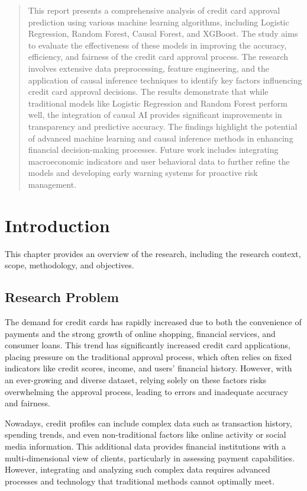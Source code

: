 \documentclass[12pt]{report}
\begin{document}
    \begin{abstract}
        This report presents a comprehensive analysis of credit card approval prediction using various machine learning algorithms, including Logistic Regression, Random Forest, Causal Forest, and XGBoost. The study aims to evaluate the effectiveness of these models in improving the accuracy, efficiency, and fairness of the credit card approval process. The research involves extensive data preprocessing, feature engineering, and the application of causal inference techniques to identify key factors influencing credit card approval decisions. The results demonstrate that while traditional models like Logistic Regression and Random Forest perform well, the integration of causal AI provides significant improvements in transparency and predictive accuracy. The findings highlight the potential of advanced machine learning and causal inference methods in enhancing financial decision-making processes. Future work includes integrating macroeconomic indicators and user behavioral data to further refine the models and developing early warning systems for proactive risk management.
    \end{abstract}

    \tableofcontents
    \listoffigures
    \listoftables

    \chapter{Introduction}
    This chapter provides an overview of the research, including the research context, scope, methodology, and objectives.

    \section{Research Problem}
    The demand for credit cards has rapidly increased due to both the convenience of payments and the strong growth of online shopping, financial services, and consumer loans. This trend has significantly increased credit card applications, placing pressure on the traditional approval process, which often relies on fixed indicators like credit scores, income, and users' financial history. However, with an ever-growing and diverse dataset, relying solely on these factors risks overwhelming the approval process, leading to errors and inadequate accuracy and fairness.

    Nowadays, credit profiles can include complex data such as transaction history, spending trends, and even non-traditional factors like online activity or social media information. This additional data provides financial institutions with a multi-dimensional view of clients, particularly in assessing payment capabilities. However, integrating and analyzing such complex data requires advanced processes and technology that traditional methods cannot optimally meet.
\end{document}
